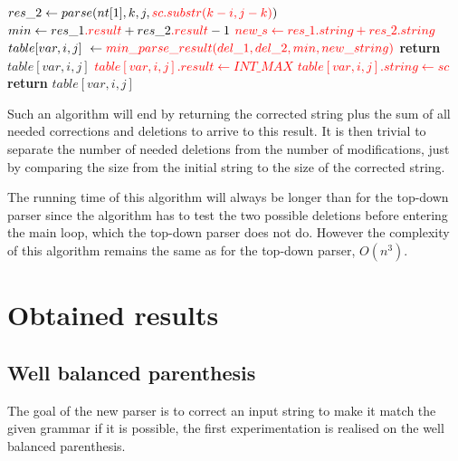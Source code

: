\begin{algorithm}
\begin{algorithmic}[1]
                            \State $res\_2 \gets parse(nt[1], k, j, \textcolor{red}{sc.substr(k - i, j - k)})$
                                    \State $min \gets res\_1\textcolor{red}{.result} + res\_2\textcolor{red}{.result} - 1$
                                    \State \textcolor{red}{$new\_s \gets res\_1.string + res\_2.string$}
                                \EndIf
                            \EndIf
                        \EndIf
                    \EndFor
                \EndFor
                \State $table[var, i, j] \gets \textcolor{red}{min\_parse\_result(del\_1, del\_2, min, new\_string)}$
                \State \textbf{return} $table[var, i, j]$
            \EndIf
            \State \textcolor{red}{$table[var, i, j].result \gets INT\_MAX$}
            \State \textcolor{red}{$table[var, i, j].string \gets sc$}
            \State \textbf{return} $table[var, i, j]$
        \EndProcedure
    \end{algorithmic}
\end{algorithm}
\FloatBarrier

Such an algorithm will end by returning the corrected string plus the sum of all needed corrections and deletions to arrive to this result.
It is then trivial to separate the number of needed deletions from the number of modifications, just by comparing the size from the initial string to the size of the corrected string.

The running time of this algorithm will always be longer than for the top-down parser since the algorithm has to test the two possible deletions before entering the main loop, which the top-down parser does not do.
However the complexity of this algorithm remains the same as for the top-down parser, $O(n^3)$.

\section{Obtained results}

\subsection{Well balanced parenthesis}

The goal of the new parser is to correct an input string to make it match the given grammar if it is possible, the first experimentation is realised on the well balanced parenthesis.


